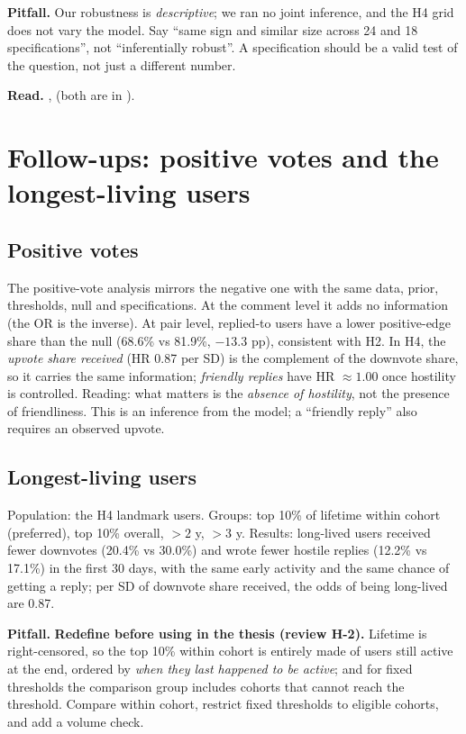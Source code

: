 \documentclass[11pt,a4paper]{article}
\newcommand{\file}[1]{\path{#1}}
\newcommand{\pitfall}[1]{\par\textbf{Pitfall.} #1}
\newcommand{\readref}[1]{\par\textbf{Read.} #1}
\begin{document}
\pitfall{Our robustness is \emph{descriptive}; we ran no joint inference, and the H4 grid does not vary the model. Say ``same sign and similar size across 24 and 18 specifications'', not ``inferentially robust''. A specification should be a valid test of the question, not just a different number.}
\readref{\cite{steegen}, \cite{simonsohn} (both are in \file{notes/papers/}).}

\section{Follow-ups: positive votes and the longest-living users}
\subsection{Positive votes}
The positive-vote analysis mirrors the negative one with the same data, prior, thresholds, null and specifications. At the comment level it adds no information (the OR is the inverse). At pair level, replied-to users have a lower positive-edge share than the null (68.6\% vs 81.9\%, $-13.3$ pp), consistent with H2. In H4, the \emph{upvote share received} (HR 0.87 per SD) is the complement of the downvote share, so it carries the same information; \emph{friendly replies} have HR $\approx1.00$ once hostility is controlled. Reading: what matters is the \emph{absence of hostility}, not the presence of friendliness. This is an inference from the model; a ``friendly reply'' also requires an observed upvote.

\subsection{Longest-living users}
Population: the H4 landmark users. Groups: top 10\% of lifetime within cohort (preferred), top 10\% overall, $>2$ y, $>3$ y. Results: long-lived users received fewer downvotes (20.4\% vs 30.0\%) and wrote fewer hostile replies (12.2\% vs 17.1\%) in the first 30 days, with the same early activity and the same chance of getting a reply; per SD of downvote share received, the odds of being long-lived are 0.87.

\pitfall{\textbf{Redefine before using in the thesis (review H-2).} Lifetime is right-censored, so the top 10\% within cohort is entirely made of users still active at the end, ordered by \emph{when they last happened to be active}; and for fixed thresholds the comparison group includes cohorts that cannot reach the threshold. Compare within cohort, restrict fixed thresholds to eligible cohorts, and add a volume check.}
\end{document}
